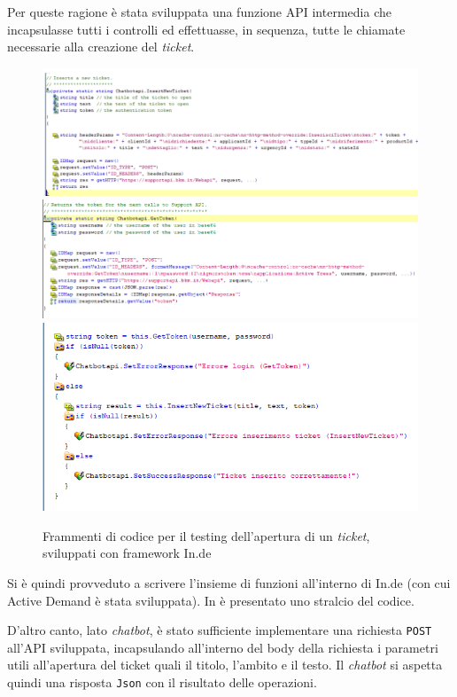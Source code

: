 Per queste ragione è stata sviluppata una funzione API intermedia che incapsulasse tutti i controlli ed effettuasse, in sequenza, tutte le chiamate necessarie alla creazione del \textit{ticket}. 

\begin{figure}
    \includegraphics*[width=15cm]{./img/api-1.png}
    \includegraphics*[width=15cm]{./img/api-2.png}
    \includegraphics*[width=\textwidth]{./img/api-3.png}
    \caption{Frammenti di codice per il testing dell'apertura di un \textit{ticket}, sviluppati con framework In.de}
    \label{fig:api}
\end{figure}

Si è quindi provveduto a scrivere l'insieme di funzioni all'interno di In.de (con cui Active Demand è stata sviluppata).
%
In  è presentato uno stralcio del codice.

D'altro canto, lato \textit{chatbot}, è stato sufficiente implementare una richiesta \texttt{POST} all'API sviluppata, incapsulando all'interno del body della richiesta i parametri utili all'apertura del ticket quali il titolo, l'ambito e il testo.
%
Il \textit{chatbot} si aspetta quindi una risposta \texttt{Json} con il risultato delle operazioni.

